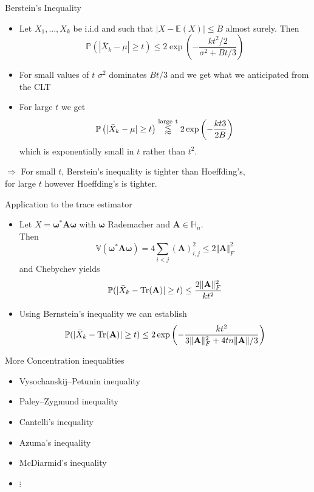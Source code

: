 \documentclass{beamer}
\newcommand{\bgk}[1]{\boldsymbol{#1}}
\newcommand{\bomega}{\bgk{\omega}}
\newcommand{\bvec}[1]{\mathbf{#1}}
\newcommand{\vA}{\bvec{A}}
\newcommand{\bitem}{\item[$\bullet$]}
\begin{document}
\begin{frame}{Berstein's Inequality}

\begin{itemize}
    \bitem Let $X_1,...,X_k$ be i.i.d and such that $|X - \mathbb{E}(X)| \leq B$ almost surely. Then
    $$
    \mathbb{P}\left(
    |\bar{X}_k - \mu| \geq t
    \right)
    \leq 2 \exp\left( 
    -\frac{kt^2/2}{\sigma^2 + B t/3}
    \right)
    $$
    \bitem For small values of $t$ $\sigma^2$ dominates $ B t/3$ and we get what we anticipated from the CLT
    \bitem For large $t$ we get
    $$
    \mathbb{P}\left(
    |\bar{X}_k - \mu| \geq t
    \right)
    \overset{{\rm large~ t}}{\lessapprox} 2 \exp\left( 
    -\frac{kt3}{ 2B}
    \right)
    $$
    which is exponentially small in $t$ rather than $t^2$.
\end{itemize}

\begin{center}
$\Rightarrow$ For small $t$, Berstein's inequality is tighter than Hoeffding's,\\ for large $t$ however Hoeffding's is tighter.     
\end{center}

\end{frame}


\begin{frame}{Application to the trace estimator}

\begin{itemize}
    \bitem Let $X = \bomega^* \vA \bomega$ with $\bomega$ Rademacher and $\vA \in \mathbb{H}_n$.\\
    Then 
    $$
    \mathbb{V}(\bomega^* \vA \bomega)
    =
    4 \sum_{i < j} (\vA)_{i,j}^2
    \leq 
    2 \Vert \vA \Vert_F^2
    $$
    and Chebychev yields
    $$
    \mathbb{P}(|\bar{X}_k - {\rm Tr}(\vA)|\geq t)
    \leq \frac{2\Vert \vA \Vert_F^2}{kt^2}
    $$
    \bitem Using Bernstein's inequality we can establish 
    $$
    \mathbb{P}(|\bar{X}_k - {\rm Tr}(\vA)|\geq t)
    \leq 2 \exp\left(
    -\frac{kt^2}{3\Vert \vA \Vert_F^2 + 4tn \Vert \vA \Vert /3}
    \right)
    $$
\end{itemize}
    
\end{frame}


\begin{frame}{More Concentration inequalities}

\begin{itemize}
    \bitem Vysochanskij–Petunin inequality
    \bitem Paley–Zygmund inequality
    \bitem Cantelli's inequality
    \bitem Azuma's inequality
    \bitem McDiarmid's inequality
    \item[] $\vdots$
\end{itemize}
    
\end{frame}
\end{document}
